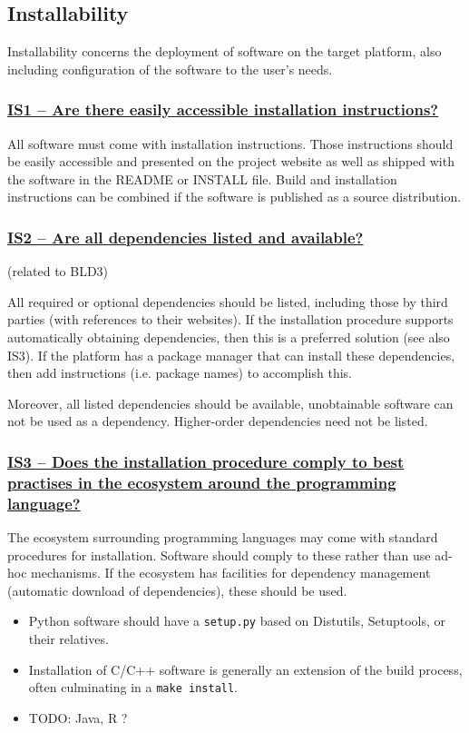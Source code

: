 \documentclass[a4paper,11pt]{article}
\newcommand{\criterion}[1]{\subsubsection*{\underline{#1}}}
\begin{document}
\subsection{Installability}

Installability concerns the deployment of software on the target platform, also
including configuration of the software to the user's needs.

\criterion{IS1 -- Are there easily accessible installation instructions?}

All software must come with installation instructions. Those instructions should
be easily accessible and presented on the project website as well as shipped
with the software in the README or INSTALL file. Build and installation
instructions can be combined if the software is published as a source
distribution.

\criterion{IS2 -- Are all dependencies listed and available?}
(related to BLD3)

All required or optional dependencies should be listed, including those by
third parties (with references to their websites). If the installation
procedure supports automatically obtaining dependencies, then this is a
preferred solution (see also IS3). If the platform has a package manager that
can install these dependencies, then add instructions (i.e. package names) to
accomplish this.

Moreover, all listed dependencies should be available, unobtainable software
can not be used as a dependency. Higher-order dependencies need not be listed.

\criterion{IS3 -- Does the installation procedure comply to best practises
in the ecosystem around the programming language?}

The ecosystem surrounding programming languages may come with standard
procedures for installation. Software should comply to these rather than use
ad-hoc mechanisms. If the ecosystem has facilities for dependency management
(automatic download of dependencies), these should be used.

\begin{itemize}
 \item Python software should have a \texttt{setup.py} based on Distutils,
     Setuptools, or their relatives.
 \item Installation of C/C++ software is generally an extension of the build
     process, often culminating in a \texttt{make install}.
 \item TODO: Java, R ?
\end{itemize}
\end{document}
